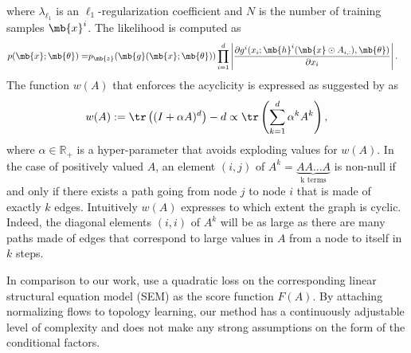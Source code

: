 where $\lambda_{\ell_1}$ is an $\ell_1$-regularization coefficient and $N$ is the number of training samples $\mb{x}^i$. The likelihood is computed as
\begin{align}
    p(\mb{x}; \mb{\theta})=& p_{\mb{z}}(\mb{g}(\mb{x}; \mb{\theta})) \prod_{i=1}^{d} \left| \frac{\partial g^i(x_i;\mb{h}^i(\mb{x} \odot A_{i,:}), \mb{\theta})}{\partial x_i} \right|. \nonumber
\end{align}
The function $w(A)$ that enforces the acyclicity is expressed as suggested by \citet{DAG-2} as
$$w(A) := \tr\left((I + \alpha A)^d\right) - d \propto	\tr\left(\sum^d_{k=1} \alpha^k A^k\right),$$
where $\alpha \in \mathbb{R}_+$ is a hyper-parameter that avoids exploding values for $w(A)$.
In the case of positively valued $A$, an element $(i, j)$ of $A^k = \underbrace{A A...A}_{\text{k terms}}$ is non-null if and only if there exists a path going from node $j$ to node $i$ that is made of exactly $k$ edges. Intuitively $w(A)$ expresses to which extent the graph is cyclic. Indeed, the diagonal elements $(i, i)$ of $A^k$ will be as large as there are many paths made of edges that correspond to large values in $A$ from a node to itself in $k$ steps.

In comparison to our work, \citet{DAG-1} use a quadratic loss on the corresponding linear structural equation model (SEM) as the score function $F(A)$. By attaching normalizing flows to topology learning, our method has a continuously adjustable level of complexity and does not make any strong assumptions on the form of the conditional factors. %


